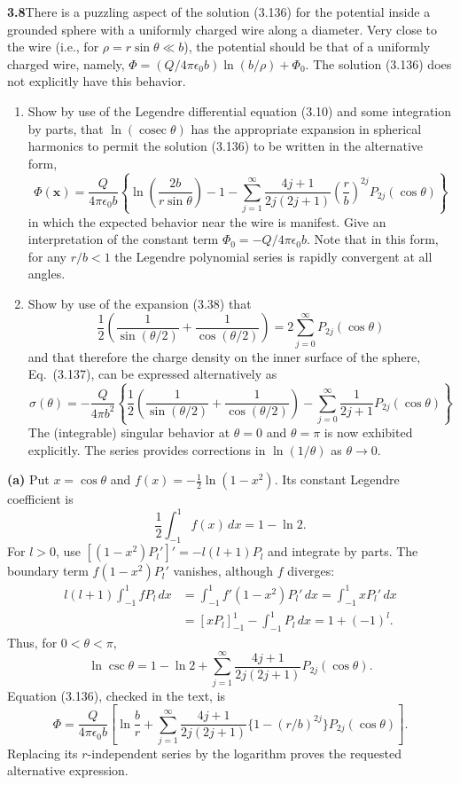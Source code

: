 \par\bigskip
\noindent\textbf{3.8}\quad There is a puzzling aspect of the solution (3.136) for the potential inside a grounded sphere with a uniformly charged wire along a diameter. Very close to the wire (i.e., for $\rho=r\sin\theta\ll b$), the potential should be that of a uniformly charged wire, namely, $\Phi=(Q/4\pi\epsilon_{0}b)\ln(b/\rho)+\Phi_{0}$. The solution (3.136) does not explicitly have this behavior.
\begin{enumerate}
\item[(a)] Show by use of the Legendre differential equation (3.10) and some integration by parts, that $\ln(\operatorname{cosec}\theta)$ has the appropriate expansion in spherical harmonics to permit the solution (3.136) to be written in the alternative form,
\[
\Phi(\mathbf{x})=\frac{Q}{4\pi\epsilon_{0}b}\left\{\ln\!\left(\frac{2b}{r\sin\theta}\right)-1-\sum_{j=1}^{\infty}\frac{4j+1}{2j(2j+1)}\left(\frac{r}{b}\right)^{2j}P_{2j}(\cos\theta)\right\}
\]
in which the expected behavior near the wire is manifest. Give an interpretation of the constant term $\Phi_{0}=-Q/4\pi\epsilon_{0}b$. Note that in this form, for any $r/b<1$ the Legendre polynomial series is rapidly convergent at all angles.
\item[(b)] Show by use of the expansion (3.38) that
\[
\frac{1}{2}\left(\frac{1}{\sin(\theta/2)}+\frac{1}{\cos(\theta/2)}\right)=2\sum_{j=0}^{\infty}P_{2j}(\cos\theta)
\]
and that therefore the charge density on the inner surface of the sphere, Eq.~(3.137), can be expressed alternatively as
\[
\sigma(\theta)=-\frac{Q}{4\pi b^{2}}\left\{\frac{1}{2}\left(\frac{1}{\sin(\theta/2)}+\frac{1}{\cos(\theta/2)}\right)-\sum_{j=0}^{\infty}\frac{1}{2j+1}P_{2j}(\cos\theta)\right\}
\]
The (integrable) singular behavior at $\theta=0$ and $\theta=\pi$ is now exhibited explicitly. The series provides corrections in $\ln(1/\theta)$ as $\theta\to0$.
\end{enumerate}
\solution

\textbf{(a)} Put $x=\cos\theta$ and
$f(x)=-\tfrac12\ln(1-x^2)$.  Its constant Legendre coefficient is
\[
\frac12\int_{-1}^1f(x)\,dx=1-\ln2.
\]
For $l>0$, use $[(1-x^2)P_l']'=-l(l+1)P_l$ and integrate by parts.
The boundary term $f(1-x^2)P_l'$ vanishes, although $f$ diverges:
\begin{align*}
l(l+1)\int_{-1}^1fP_l\,dx
&=\int_{-1}^1f'(1-x^2)P_l'\,dx
=\int_{-1}^1xP_l'\,dx\\
&=[xP_l]_{-1}^1-\int_{-1}^1P_l\,dx
=1+(-1)^l.
\end{align*}
Thus, for $0<\theta<\pi$,
\[
\ln\csc\theta=1-\ln2+
\sum_{j=1}^\infty\frac{4j+1}{2j(2j+1)}P_{2j}(\cos\theta).
\]
Equation (3.136), checked in the text, is
\[
\Phi=\frac{Q}{4\pi\epsilon_0b}\left[
\ln\frac br+\sum_{j=1}^\infty
\frac{4j+1}{2j(2j+1)}\{1-(r/b)^{2j}\}P_{2j}(\cos\theta)\right].
\]
Replacing its $r$-independent series by the logarithm proves the
requested alternative expression.

